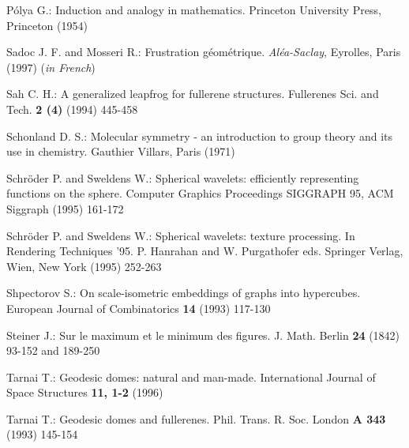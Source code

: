 \begin{thebibliography}{99}
P\'olya G.:
Induction and analogy in mathematics.
Princeton University Press, Princeton (1954)
\vspace{-3mm}

Sadoc J. F. and Mosseri R.:
Frustration g\'eom\'etrique.
{\em Al\'ea-Saclay}, Eyrolles, Paris (1997) ({\it in French})
\vspace{-3mm}

Sah C. H.:
A generalized leapfrog for fullerene structures.
Fullerenes Sci. and Tech. {\bf 2 (4)} (1994) 445-458
\vspace{-3mm}

Schonland D. S.:
Molecular symmetry - an introduction to group theory and its use in
chemistry.
Gauthier Villars, Paris (1971) 
\vspace{-3mm}

Schr\"oder P. and Sweldens W.:
Spherical wavelets: efficiently representing functions on the sphere.
Computer Graphics Proceedings SIGGRAPH 95, ACM Siggraph  (1995)
161-172
\vspace{-3mm}

Schr\"oder P. and Sweldens W.:
Spherical wavelets: texture processing.
In Rendering Techniques '95.  P. Hanrahan and W. Purgathofer eds. Springer Verlag,
Wien, New York
(1995) 252-263
\vspace{-3mm}

Shpectorov S.: 
On scale-isometric embeddings of graphs into hypercubes. 
European Journal of Combinatorics {\bf 14} (1993) 117-130 
\vspace{-3mm}


Steiner J.:
Sur le maximum et le minimum des figures.
J. Math. Berlin {\bf 24} (1842) 93-152 and 189-250
\vspace{-3mm}

Tarnai T.:
Geodesic domes: natural and man-made.
International Journal of Space Structures {\bf 11, 1-2} (1996) 
\vspace{-3mm}

Tarnai T.:
Geodesic domes and fullerenes.
Phil. Trans. R. Soc. London {\bf A 343} (1993) 145-154
\vspace{-3mm}


\end{thebibliography}
